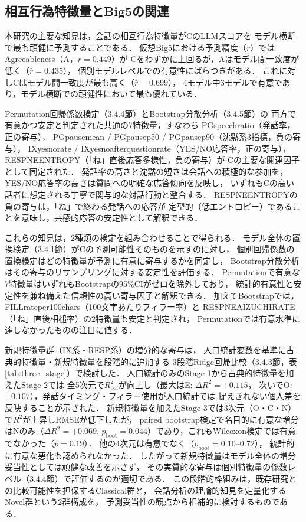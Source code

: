 \documentclass[dvipdfmx,11pt,a4paper]{bxjsarticle}
\renewcommand{\_}{\paperorigunderscore\allowbreak}%
\begin{document}
\subsection{相互行為特徴量とBig5の関連}

本研究の主要な知見は，会話の相互行為特徴量がCのLLMスコアを
モデル横断で最も頑健に予測することである．
仮想Big5における予測精度（$r$）ではAgreeableness（A，$r = 0.449$）が
Cをわずかに上回るが，Aはモデル間一致度が低く（$\bar{r} = 0.435$），
個別モデルレベルでの有意性にばらつきがある．
これに対しCはモデル間一致度が最も高く（$\bar{r} = 0.699$），
4モデル中3モデルで有意であり，モデル横断での頑健性において最も優れている．

Permutation回帰係数検定（3.4.4節）とBootstrap分散分析（3.4.5節）の
両方で有意かつ安定と判定された共通の7特徴量，すなわち
PG\_speech\_ratio（発話率，正の寄与），
PG\_pause\_mean / PG\_pause\_p50 / PG\_pause\_p90（沈黙系3指標，負の寄与），
IX\_yesno\_rate / IX\_yesno\_after\_question\_rate（YES/NO応答率，正の寄与），
RESP\_NE\_ENTROPY（「ね」直後応答多様性，負の寄与）が
Cの主要な関連因子として同定された．
発話率の高さと沈黙の短さは会話への積極的な参加を，
YES/NO応答率の高さは質問への明確な応答傾向を反映し，
いずれもCの高い話者に想定される丁寧で関与的な対話行動と整合する．
RESP\_NE\_ENTROPYの負の寄与は，「ね」で終わる発話への応答が
定型的（低エントロピー）であることを意味し，共感的応答の安定性として解釈できる．

これらの知見は，2種類の検定を組み合わせることで得られる．
モデル全体の置換検定（3.4.1節）がCの予測可能性そのものを示すのに対し，
個別回帰係数の置換検定はどの特徴量が予測に有意に寄与するかを同定し，
Bootstrap分散分析はその寄与のリサンプリングに対する安定性を評価する．
Permutationで有意な7特徴量はいずれもBootstrapの95\%CIがゼロを除外しており，
統計的有意性と安定性を兼ね備えた信頼性の高い寄与因子と解釈できる．
加えてBootstrapでは，FILL\_rate\_per\_100chars（100文字あたりフィラー率）と
RESP\_NE\_AIZUCHI\_RATE（「ね」直後相槌率）の2特徴量も安定と判定され，
Permutationでは有意水準に達しなかったものの注目に値する．

新規特徴量群（IX系・RESP系）の増分的な寄与は，
人口統計変数を基準に古典的特徴量・新規特徴量を段階的に追加する
3段階Ridge回帰比較（3.4.3節，表\ref{tab:three_stage}）で検討した．
人口統計のみのStage 1から古典的特徴量を加えたStage 2では
全5次元で$R^2_{\text{oof}}$が向上し（最大はE: $\Delta R^2 = +0.115$，
次いでO: $+0.107$），発話タイミング・フィラー使用が人口統計では
捉えきれない個人差を反映することが示された．
新規特徴量を加えたStage 3では3次元（O・C・N）で$R^2$が上昇しRMSEが低下したが，
paired bootstrap検定で名目的に有意な増分はNのみ（$\Delta R^2 = +0.069$,
$p_{\text{boot}} = 0.044$）であり，これもWilcoxon検定では有意でなかった（$p = 0.19$）．
他の4次元は有意でなく（$p_{\text{boot}} = 0.10$--$0.72$），
統計的に有意な悪化も認められなかった．
したがって新規特徴量はモデル全体の増分妥当性としては頑健な改善を示さず，
その実質的な寄与は個別特徴量の係数レベル（3.4.4節）で評価するのが適切である．
この段階的枠組みは，既存研究との比較可能性を担保するClassical群と，
会話分析の理論的知見を定量化するNovel群という2群構成を，
予測妥当性の観点から相補的に検討するものである．
\end{document}
